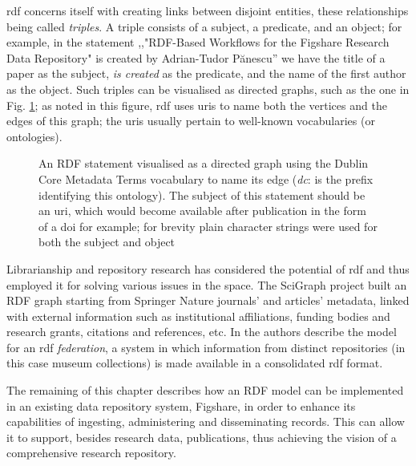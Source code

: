 \gls{rdf} concerns itself with creating links between disjoint entities, these relationships being called \emph{triples}. 
A triple consists of a subject, a predicate, and an object; for example, in the statement ,,"RDF-Based Workflows for the
Figshare Research Data Repository" is created by Adrian-Tudor P\u{a}nescu'' we have the title of a paper as the
subject, \emph{is created} as the predicate, and the name of the first author as the object. Such triples can be visualised
as directed graphs, such as the one in Fig. \ref{fig:graphinit}; as noted in this figure, \gls{rdf} uses \glspl{uri}
to name both the vertices and the edges of this graph; the \glspl{uri} usually pertain to well-known vocabularies (or ontologies).

\begin{figure}[thpb]
  \centering
  \caption{An RDF statement visualised as a directed graph using the Dublin Core Metadata Terms vocabulary to name its edge (\emph{dc}: is the prefix identifying this ontology). The subject of this statement should be an \gls{uri}, which would become available after publication in the form of a \gls{doi} for example; for brevity plain character strings were used for both the subject and object}
  \label{fig:graphinit}
\end{figure}

Librarianship and repository research has considered the potential of \gls{rdf} and thus employed it for solving various issues in the space. The SciGraph project \cite{scigraph} built an RDF graph starting from Springer Nature journals' and articles' metadata, linked with external information such as institutional affiliations, funding bodies and research grants, citations and references, etc.  In \cite{ichim} the authors describe the model for an \gls{rdf} \emph{federation}, a system in which information from distinct repositories (in this case museum collections) is made available in a consolidated \gls{rdf} format.

The remaining of this chapter describes how an RDF model can be implemented in an existing data repository system, Figshare, in order to enhance its capabilities of ingesting, administering and disseminating records. This can allow it to support, besides research data, publications, thus achieving the vision of a comprehensive research repository. 

